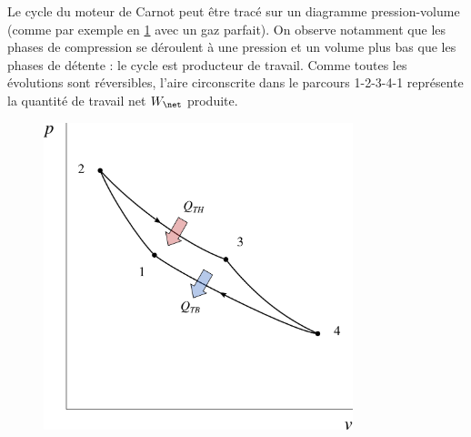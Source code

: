 		Le cycle du moteur de Carnot peut être tracé sur un diagramme pression-volume (comme par exemple en \cref{fig_p-v_gp_carnot} avec un gaz parfait). On observe notamment que les phases de compression se déroulent à une pression et un volume plus bas que les phases de détente : le cycle est producteur de travail. Comme toutes les évolutions sont réversibles, l’aire circonscrite dans le parcours 1-2-3-4-1 représente la quantité de travail net $W_\net$ produite.

		\begin{figure}[htc]%
			\begin{center}
				\includegraphics[width=9cm]{images/carnot_pv_gp_moteur.png}
			\end{center}
			\label{fig_p-v_gp_carnot}
		\end{figure}


